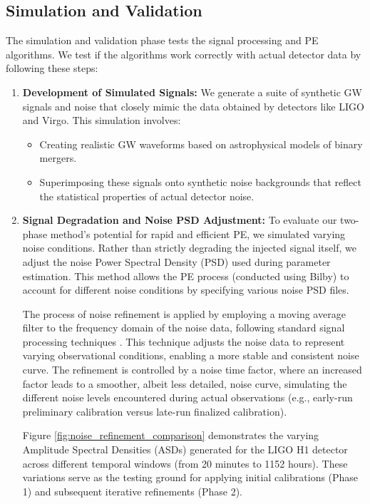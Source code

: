 \documentclass[12pt]{article}
\begin{document}
\subsection{Simulation and Validation}

The simulation and validation phase tests the signal processing and PE algorithms. We test if the algorithms work correctly with actual detector data by following these steps:

\begin{enumerate}
    \item \textbf{Development of Simulated Signals:} We generate a suite of synthetic GW signals and noise that closely mimic the data obtained by detectors like LIGO and Virgo. This simulation involves:
    \begin{itemize}
        \item Creating realistic GW waveforms based on astrophysical models of binary mergers.
        \item Superimposing these signals onto synthetic noise backgrounds that reflect the statistical properties of actual detector noise.
    \end{itemize}

    \item \textbf{Signal Degradation and Noise PSD Adjustment:}
    To evaluate our two-phase method's potential for rapid and efficient PE, we simulated varying noise conditions. Rather than strictly degrading the injected signal itself, we adjust the noise Power Spectral Density (PSD) used during parameter estimation. This method allows the PE process (conducted using Bilby) to account for different noise conditions by specifying various noise PSD files.

    The process of noise refinement is applied by employing a moving average filter to the frequency domain of the noise data, following standard signal processing techniques \cite{Welch1967}. This technique adjusts the noise data to represent varying observational conditions, enabling a more stable and consistent noise curve. The refinement is controlled by a noise time factor, where an increased factor leads to a smoother, albeit less detailed, noise curve, simulating the different noise levels encountered during actual observations (e.g., early-run preliminary calibration versus late-run finalized calibration).

    Figure \ref{fig:noise_refinement_comparison} demonstrates the varying Amplitude Spectral Densities (ASDs) generated for the LIGO H1 detector across different temporal windows (from 20 minutes to 1152 hours). These variations serve as the testing ground for applying initial calibrations (Phase 1) and subsequent iterative refinements (Phase 2).


\end{enumerate}
\end{document}
